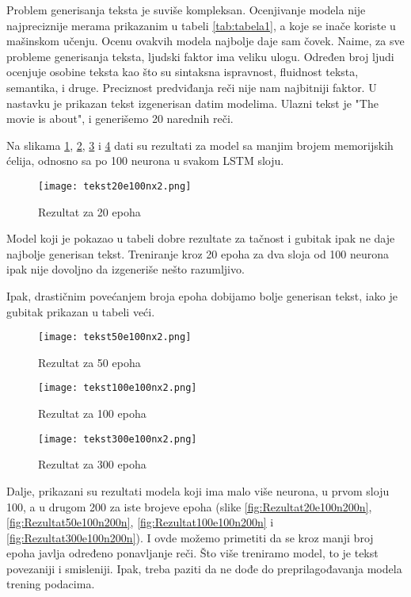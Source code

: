 \documentclass[a4paper]{article}
\begin{document}
Problem generisanja teksta je suviše kompleksan. Ocenjivanje modela nije najpreciznije merama prikazanim u tabeli \ref{tab:tabela1}, a koje se inače koriste u mašinskom učenju. Ocenu ovakvih modela najbolje daje sam čovek. Naime, za sve probleme generisanja teksta, ljudski faktor ima veliku ulogu. Određen broj ljudi ocenjuje osobine teksta kao što su sintaksna ispravnost, fluidnost teksta, semantika, i druge. Preciznost predviđanja reči nije nam najbitniji faktor. U nastavku je prikazan tekst izgenerisan datim modelima.
Ulazni tekst je "The movie is about", i generišemo 20 narednih reči. 

Na slikama \ref{fig:Rezultat20e100n}, \ref{fig:Rezultat50e100n}, \ref{fig:Rezultat100e100n} i \ref{fig:Rezultat300e100n} dati su rezultati za model
sa manjim brojem memorijskih ćelija, odnosno sa po 100 neurona u svakom LSTM sloju.

\begin{figure}[htp]
    \centering
    \texttt{[image: tekst20e100nx2.png]}
    \caption{Rezultat za 20 epoha}
    \label{fig:Rezultat20e100n}
\end{figure}

Model koji je pokazao u tabeli dobre rezultate za tačnost i gubitak ipak ne daje najbolje generisan tekst. Treniranje kroz 20 epoha za dva sloja od 100 neurona ipak nije dovoljno da izgeneriše nešto razumljivo.

Ipak, drastičnim povećanjem broja epoha dobijamo bolje generisan tekst, iako je gubitak prikazan u tabeli veći.

\begin{figure}[htp]
    \centering
    \texttt{[image: tekst50e100nx2.png]}
    \caption{Rezultat za 50 epoha}
    \label{fig:Rezultat50e100n}
\end{figure}

\begin{figure}[htp]
    \centering
    \texttt{[image: tekst100e100nx2.png]}
    \caption{Rezultat za 100 epoha}
    \label{fig:Rezultat100e100n}
\end{figure}

\begin{figure}[!h]
    \centering
    \texttt{[image: tekst300e100nx2.png]}
    \caption{Rezultat za 300 epoha}
    \label{fig:Rezultat300e100n}
\end{figure}

Dalje, prikazani su rezultati modela koji ima malo više neurona, u prvom sloju 100, a u drugom 200 za iste brojeve epoha (slike \ref{fig:Rezultat20e100n200n}, \ref{fig:Rezultat50e100n200n}, \ref{fig:Rezultat100e100n200n} i \ref{fig:Rezultat300e100n200n}). I ovde možemo primetiti da se kroz manji broj epoha javlja određeno ponavljanje reči. Što više treniramo model, to je tekst povezaniji i smisleniji. Ipak, treba paziti da ne dođe do preprilagođavanja modela trening podacima. 
\end{document}
